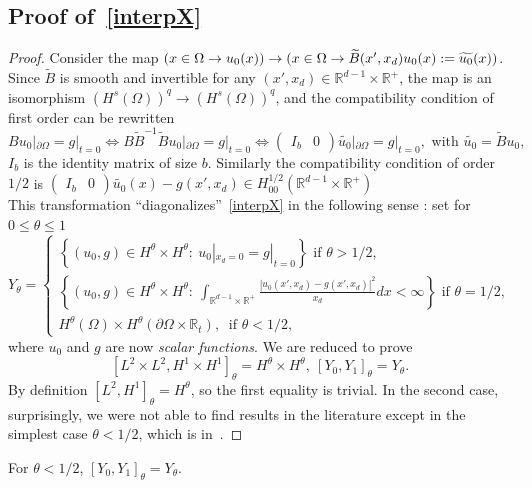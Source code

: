\documentclass[AHL,Unicode,longabstracts,published]{cedram}
\newcommand{\R}{\mathbb{R}}
\newcommand{\di}{\displaystyle}
\begin{document}
\subsection{Proof of~\eqref{interpX}}
\begin{proof}
Consider the map $(x\in \Omega\to u_0(x))\to (x\in \Omega\to
\widetilde{B}(x',x_d)u_0(x)\linebreak :=\widetilde{u_0}(x))$. Since $\widetilde{B}$ is smooth and invertible for any $(x',x_d)\in \R^{d-1}\times \R^+$, the map is an isomorphism $(H^s(\Omega))^q\to (H^s(\Omega))^q$, and the compatibility condition of first order can be rewritten
\[
Bu_0|_{\partial\Omega}=g|_{t=0}
\Leftrightarrow B\widetilde{B}^{-1}
\widetilde{B}u_0|_{\partial\Omega} =g|_{t=0}\Leftrightarrow
\begin{pmatrix}
I_b & 0
\end{pmatrix}
\widetilde{u_0}|_{\partial\Omega} =g|_{t=0},\text{ with }\widetilde{u_0}=\widetilde{B}u_0,
\]
$I_b$ is the identity matrix of size $b$. Similarly the compatibility condition of order $1/2$ is $
(\begin{smallmatrix}
I_b & 0
\end{smallmatrix})\widetilde{u_0}(x)-g(x',x_d)\in H^{1/2}_{00}(\R^{d-1}\times \R^+)$\\
This transformation ``diagonalizes''~\eqref{interpX} in the following sense : set for $0\leq \theta\leq 1$
\[
Y_\theta=
\left\{
\begin{array}{ll}
\di \left\{(u_0,g)\in H^\theta\times H^\theta:\ u_0|_{x_d=0}=g|_{t=0}\right\}\text{ if }\theta >1/2,
\\
\di \left\{(u_0,g)\in H^\theta\times H^\theta:\
\int_{\R^{d-1}\times \R^+}\frac{\left|u_0(x',x_d)-g(x',x_d)\right|^2}{x_d}dx<\infty\right\}\text{ if }\theta =1/2,\\
\di H^\theta(\Omega)\times H^\theta(\partial\Omega\times \R_t),\ \text{ if }\theta <1/2,
\end{array}\right.
\]
where $u_0$ and $g$ are now \emph{scalar functions}. We are reduced to prove
\[
\left[L^2\times L^2,H^1\times H^1\right]_\theta=H^\theta\times H^\theta,\ [Y_0,Y_1]_\theta=Y_\theta.
\]
By definition $[L^2,H^1]_\theta=H^\theta$, so the first equality is trivial. In the second case, surprisingly, we were not able to find results in the literature except in the simplest case $\theta<1/2$, which is in~\cite[Section~14]{lionsmagenes2}.
\end{proof}

\begin{lemm}\label{interpfacile}
For $\theta<1/2$, $[Y_0,Y_1]_\theta=Y_\theta$.
\end{lemm}
\end{document}
